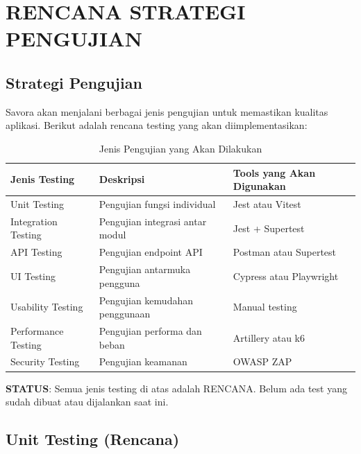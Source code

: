 \section{RENCANA STRATEGI PENGUJIAN}

\subsection{Strategi Pengujian}

Savora akan menjalani berbagai jenis pengujian untuk memastikan kualitas aplikasi. Berikut adalah rencana testing yang akan diimplementasikan:

\begin{table}[htbp]
\centering
\caption{Jenis Pengujian yang Akan Dilakukan}
\label{tab:testing}
\begin{tabularx}{\textwidth}{|l|X|X|}
\hline
\textbf{Jenis Testing} & \textbf{Deskripsi} & \textbf{Tools yang Akan Digunakan} \\
\hline
Unit Testing & Pengujian fungsi individual & Jest atau Vitest \\
\hline
Integration Testing & Pengujian integrasi antar modul & Jest + Supertest \\
\hline
API Testing & Pengujian endpoint API & Postman atau Supertest \\
\hline
UI Testing & Pengujian antarmuka pengguna & Cypress atau Playwright \\
\hline
Usability Testing & Pengujian kemudahan penggunaan & Manual testing \\
\hline
Performance Testing & Pengujian performa dan beban & Artillery atau k6 \\
\hline
Security Testing & Pengujian keamanan & OWASP ZAP \\
\hline
\end{tabularx}
\end{table}

\textbf{STATUS}: Semua jenis testing di atas adalah RENCANA. Belum ada test yang sudah dibuat atau dijalankan saat ini.

\subsection{Unit Testing (Rencana)}

